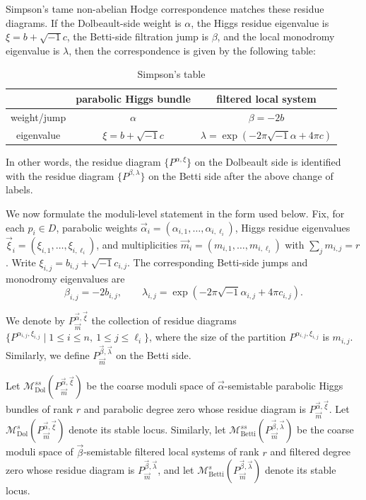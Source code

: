 \documentclass[11pt]{amsart}
\theoremstyle{plain}
\theoremstyle{definition}
\theoremstyle{remark}
\begin{document}
Simpson's tame non-abelian Hodge correspondence matches these residue diagrams. If the Dolbeault-side weight is $\alpha$, the Higgs residue eigenvalue is $\xi=b+\sqrt{-1}c$, the Betti-side filtration jump is $\beta$, and the local monodromy eigenvalue is $\lambda$, then the correspondence is given by the following table:
\begin{center}
\begin{table}[h]
    \centering
    \caption{Simpson's table}\label{table:simpson}
    \begin{tabular}{|c|c|c|}
        \hline
         & parabolic Higgs bundle & filtered local system \\
        \hline
        weight/jump & $\alpha$ & $\beta=-2b$ \\
        \hline
        eigenvalue & $\xi=b+\sqrt{-1}c$ & $\lambda=\exp(-2\pi\sqrt{-1}\alpha+4\pi c)$ \\
        \hline
    \end{tabular}
\end{table}
\end{center}
In other words, the residue diagram $\{P^{\alpha,\xi}\}$ on the Dolbeault side is identified with the residue diagram $\{P^{\beta,\lambda}\}$ on the Betti side after the above change of labels.

We now formulate the moduli-level statement in the form used below. Fix, for each $p_i\in D$, parabolic weights $\vec\alpha_i=(\alpha_{i,1},\ldots,\alpha_{i,\ell_i})$, Higgs residue eigenvalues $\vec\xi_i=(\xi_{i,1},\ldots,\xi_{i,\ell_i})$, and multiplicities $\vec m_i=(m_{i,1},\ldots,m_{i,\ell_i})$ with $\sum_jm_{i,j}=r$. Write $\xi_{i,j}=b_{i,j}+\sqrt{-1}c_{i,j}$. The corresponding Betti-side jumps and monodromy eigenvalues are
\[
\beta_{i,j}=-2b_{i,j},
\qquad
\lambda_{i,j}=\exp(-2\pi\sqrt{-1}\alpha_{i,j}+4\pi c_{i,j}).
\]

We denote by $P^{\vec\alpha,\vec\xi}_{\vec m}$ the collection of residue diagrams $\{P^{\alpha_{i,j},\xi_{i,j}}\mid 1\leq i\leq n,\ 1\leq j\leq \ell_i\}$, where the size of the partition $P^{\alpha_{i,j},\xi_{i,j}}$ is $m_{i,j}$. Similarly, we define $P^{\vec\beta,\vec\lambda}_{\vec m}$ on the Betti side.

Let $\mathcal M^{ss}_{\mathrm{Dol}}(P^{\vec\alpha,\vec\xi}_{\vec m})$ be the coarse moduli space of $\vec\alpha$-semistable parabolic Higgs bundles of rank $r$ and parabolic degree zero whose residue diagram is $P^{\vec\alpha,\vec\xi}_{\vec m}$. Let $\mathcal M^{s}_{\mathrm{Dol}}(P^{\vec\alpha,\vec\xi}_{\vec m})$ denote its stable locus. Similarly, let $\mathcal M^{ss}_{\mathrm{Betti}}(P^{\vec\beta,\vec\lambda}_{\vec m})$ be the coarse moduli space of $\vec\beta$-semistable filtered local systems of rank $r$ and filtered degree zero whose residue diagram is $P^{\vec\beta,\vec\lambda}_{\vec m}$, and let $\mathcal M^{s}_{\mathrm{Betti}}(P^{\vec\beta,\vec\lambda}_{\vec m})$ denote its stable locus.
\end{document}
